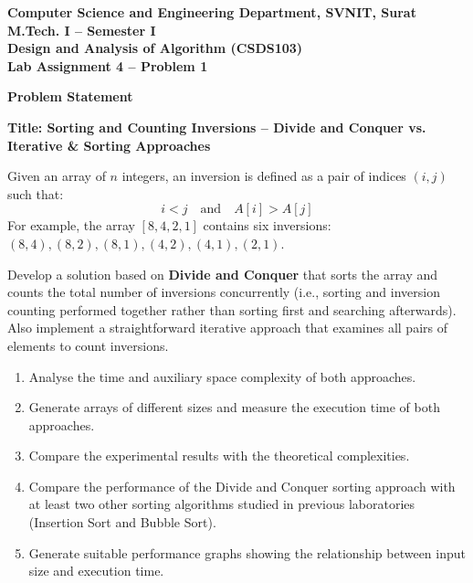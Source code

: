 \documentclass[12pt]{article}
\begin{document}

\begin{center}
\textbf{Computer Science and Engineering Department, SVNIT, Surat}\\
\textbf{M.Tech. I -- Semester I}\\
\textbf{Design and Analysis of Algorithm (CSDS103)}\\
\textbf{Lab Assignment 4 -- Problem 1}
\end{center}

\vspace{0.4cm}

\textbf{Problem Statement}

\textbf{Title: Sorting and Counting Inversions -- Divide and Conquer vs. Iterative \& Sorting Approaches}

Given an array of $n$ integers, an inversion is defined as a pair of indices $(i, j)$ such that:
\[
i < j \quad \text{and} \quad A[i] > A[j]
\]
For example, the array $[8, 4, 2, 1]$ contains six inversions: $(8, 4), (8, 2), (8, 1), (4, 2), (4, 1), (2, 1)$.

Develop a solution based on \textbf{Divide and Conquer} that sorts the array and counts the total number of inversions concurrently (i.e., sorting and inversion counting performed together rather than sorting first and searching afterwards). Also implement a straightforward iterative approach that examines all pairs of elements to count inversions.

\begin{enumerate}
    \item Analyse the time and auxiliary space complexity of both approaches.
    \item Generate arrays of different sizes and measure the execution time of both approaches.
    \item Compare the experimental results with the theoretical complexities.
    \item Compare the performance of the Divide and Conquer sorting approach with at least two other sorting algorithms studied in previous laboratories (Insertion Sort and Bubble Sort).
    \item Generate suitable performance graphs showing the relationship between input size and execution time.
\end{enumerate}
\end{document}
